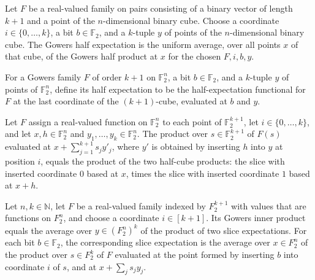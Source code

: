 \begin{definition}
\label{FABL.gowersHalfExpectationAt}
\leanok
{}
Let $F$ be a real-valued family on pairs consisting of a binary vector of length $k+1$
and a point of the $n$-dimensional binary cube. Choose a coordinate
$i\in\{0,\ldots,k\}$, a bit $b\in\mathbb{F}_2$, and a $k$-tuple $y$ of points of the
$n$-dimensional binary cube. The Gowers half expectation is the uniform average, over
all points $x$ of that cube, of the Gowers half product at $x$ for the chosen $F,i,b,y$.
\end{definition}

\begin{definition}
\label{FABL.gowersHalfExpectation}
\leanok
{}
For a Gowers family $F$ of order $k+1$ on $\mathbb{F}_2^n$, a bit $b\in\mathbb{F}_2$, and a $k$-tuple $y$ of points of $\mathbb{F}_2^n$, define its half expectation to be the half-expectation functional for $F$ at the last coordinate of the $(k+1)$-cube, evaluated at $b$ and $y$.
\end{definition}

\begin{theorem}
\label{FABL.gowersProduct_insertNth}
\leanok
{}
Let $F$ assign a real-valued function on $\mathbb{F}_2^n$ to each point of
$\mathbb{F}_2^{k+1}$, let $i\in\{0,\ldots,k\}$, and let $x,h\in\mathbb{F}_2^n$ and
$y_1,\ldots,y_k\in\mathbb{F}_2^n$. The product over $s\in\mathbb{F}_2^{k+1}$ of $F(s)$
evaluated at $x+\sum_{j=1}^{k+1}s_j y'_j$, where $y'$ is obtained by inserting $h$ into
$y$ at position $i$, equals the product of the two half-cube products: the slice with
inserted coordinate $0$ based at $x$, times the slice with inserted coordinate $1$ based
at $x+h$.
\end{theorem}

\begin{theorem}
\label{FABL.gowersInner_split_at}
\leanok
{}
Let $n,k\in\mathbb N$, let $F$ be a real-valued family indexed by $F_2^{k+1}$ with
values that are functions on $F_2^n$, and choose a coordinate $i\in[k+1]$. Its Gowers
inner product equals the average over $y\in(F_2^n)^k$ of the product of two slice
expectations. For each bit $b\in\mathbb F_2$, the corresponding slice expectation is the
average over $x\in F_2^n$ of the product over $s\in F_2^k$ of $F$ evaluated at the point
formed by inserting $b$ into coordinate $i$ of $s$, and at $x+\sum_j s_jy_j$.
\end{theorem}

